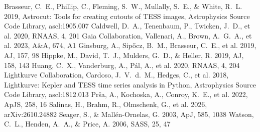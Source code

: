 \documentclass{aastex701}
\begin{document}
\begin{thebibliography}{}
 Brasseur, C.~E., Phillip, C., Fleming, S.~W., Mullally, S.~E., \& White, R.~L. 2019, Astrocut: Tools for creating cutouts of TESS images, Astrophysics Source Code Library, ascl:1905.007
 Caldwell, D.~A., Tenenbaum, P., Twicken, J.~D., et al. 2020, RNAAS, 4, 201
 Gaia Collaboration, Vallenari, A., Brown, A.~G.~A., et al. 2023, A\&A, 674, A1
 Ginsburg, A., Sip{\H o}cz, B.~M., Brasseur, C.~E., et al. 2019, AJ, 157, 98
 Hippke, M., David, T.~J., Mulders, G.~D., \& Heller, R. 2019, AJ, 158, 143
 Huang, C.~X., Vanderburg, A., P\'al, A., et al. 2020, RNAAS, 4, 204
 Lightkurve Collaboration, Cardoso, J.~V.~d.~M., Hedges, C., et al. 2018, Lightkurve: Kepler and TESS time series analysis in Python, Astrophysics Source Code Library, ascl:1812.013
 Pr{\v s}a, A., Kochoska, A., Conroy, K.~E., et al. 2022, ApJS, 258, 16
 Salinas, H., Brahm, R., Olmschenk, G., et al. 2026, arXiv:2610.24882
 Seager, S., \& Mall{\'e}n-Ornelas, G. 2003, ApJ, 585, 1038
 Watson, C.~L., Henden, A.~A., \& Price, A. 2006, SASS, 25, 47
\end{thebibliography}
\end{document}
